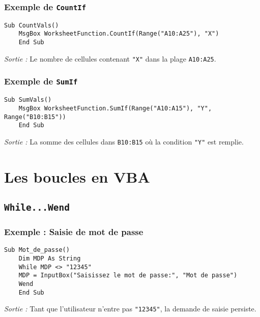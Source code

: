 \documentclass[a4paper,12pt]{report}
\begin{document}
\subsubsection{Exemple de \texttt{CountIf}}
\begin{lstlisting}[language=VBScript]
	Sub CountVals()
	MsgBox WorksheetFunction.CountIf(Range("A10:A25"), "X")
	End Sub
\end{lstlisting}

\emph{Sortie :} Le nombre de cellules contenant \texttt{"X"} dans la plage \texttt{A10:A25}.

\subsubsection{Exemple de \texttt{SumIf}}
\begin{lstlisting}[language=VBScript]
	Sub SumVals()
	MsgBox WorksheetFunction.SumIf(Range("A10:A15"), "Y", Range("B10:B15"))
	End Sub
\end{lstlisting}

\emph{Sortie :} La somme des cellules dans \texttt{B10:B15} où la condition \texttt{"Y"} est remplie.

\section{Les boucles en VBA}

\subsection{\texttt{While...Wend}}

\subsubsection{Exemple : Saisie de mot de passe}
\begin{lstlisting}[language=VBScript]
	Sub Mot_de_passe()
	Dim MDP As String
	While MDP <> "12345"
	MDP = InputBox("Saisissez le mot de passe:", "Mot de passe")
	Wend
	End Sub
\end{lstlisting}

\emph{Sortie :} Tant que l'utilisateur n'entre pas \texttt{"12345"}, la demande de saisie persiste.


	
\end{document}
